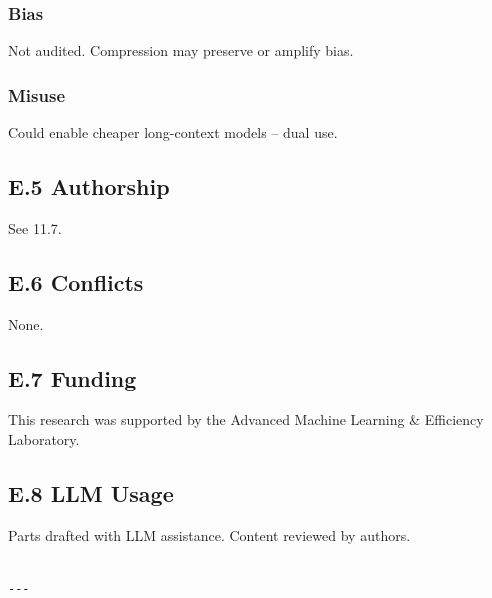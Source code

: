 \subsubsection{Bias}
Not audited. Compression may preserve or amplify bias.

\subsubsection{Misuse}
Could enable cheaper long-context models -- dual use.

\subsection{E.5 Authorship}

See  11.7.

\subsection{E.6 Conflicts}

None.

\subsection{E.7 Funding}

This research was supported by the Advanced Machine Learning \& Efficiency Laboratory.

\subsection{E.8 LLM Usage}

Parts drafted with LLM assistance. Content reviewed by authors.
\begin{lstlisting}

---
\end{lstlisting}